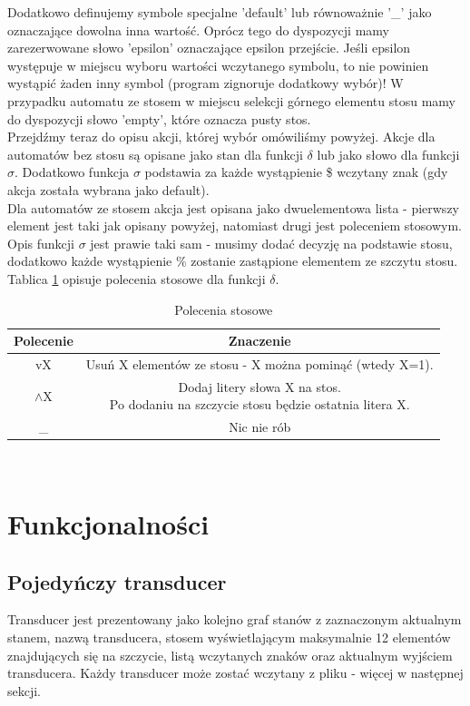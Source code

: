 \documentclass[declaration,shortabstract]{iithesis}
\theoremstyle{definition}
\theoremstyle{plain}
\begin{document}
Dodatkowo definujemy symbole specjalne 'default' lub równoważnie '\_' jako oznaczające dowolna inna wartość. Oprócz tego do dyspozycji mamy zarezerwowane słowo 'epsilon' oznaczające epsilon przejście. Jeśli epsilon występuje w miejscu wyboru wartości wczytanego symbolu, to nie powinien wystąpić żaden inny symbol (program zignoruje dodatkowy wybór)! W przypadku automatu ze stosem w miejscu selekcji górnego elementu stosu mamy do dyspozycji słowo 'empty', które oznacza pusty stos. \\
Przejdźmy teraz do opisu akcji, której wybór omówiliśmy powyżej. Akcje dla automatów bez stosu są opisane jako stan dla funkcji \(\delta\) lub jako słowo dla funkcji \(\sigma\). Dodatkowo funkcja \(\sigma\) podstawia za każde wystąpienie \$ wczytany znak (gdy akcja została wybrana jako default).\\
\pagebreak
Dla automatów ze stosem akcja jest opisana jako dwuelementowa lista - pierwszy element jest taki jak opisany powyżej, natomiast drugi jest poleceniem stosowym. Opis funkcji \(\sigma\) jest prawie taki sam - musimy dodać decyzję na podstawie stosu, dodatkowo każde wystąpienie \% zostanie zastąpione elementem ze szczytu stosu. Tablica \ref{tab:polecenia_stosowe} opisuje polecenia stosowe dla funkcji \(\delta\).\\
\begin{table}[h]
    \centering
    \begin{tabular}{|c|c|}
    \hline
    Polecenie & Znaczenie \\ \hline
    vX     & Usuń X elementów ze stosu - X można pominąć (wtedy X=1). \\ \hline
    \(\wedge\)X     & \makecell{Dodaj litery słowa X na stos.\\Po dodaniu na szczycie stosu będzie ostatnia litera X.} \\ \hline
    \_ & Nic nie rób \\ \hline
    
    \end{tabular}
    \caption{Polecenia stosowe}
    \label{tab:polecenia_stosowe}
\end{table}\\
\pagebreak
\section {Funkcjonalności}
\subsection{Pojedyńczy transducer}
Transducer jest prezentowany jako kolejno graf stanów z zaznaczonym aktualnym stanem, nazwą transducera, stosem wyświetlającym maksymalnie 12 elementów znajdujących się na szczycie, listą wczytanych znaków oraz aktualnym wyjściem transducera. Każdy transducer może zostać wczytany z pliku - więcej w następnej sekcji.
\end{document}
